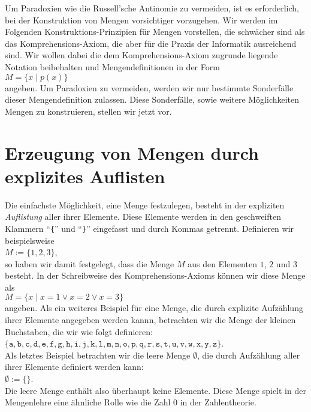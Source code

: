 Um  Paradoxien wie die Russell'sche Antinomie  zu vermeiden, ist es erforderlich, bei der
Konstruktion von Mengen vorsichtiger vorzugehen.
Wir werden im Folgenden Konstruktions-Prinzipien f\"{u}r Mengen vorstellen,
die schw\"{a}cher sind als das Komprehensions-Axiom, die aber f\"{u}r die Praxis der Informatik
ausreichend sind.  Wir wollen dabei die dem Komprehensions-Axiom zugrunde liegende Notation 
beibehalten und Mengendefinitionen in der Form \\[0.2cm]
\hspace*{1.3cm} $M = \{ x \mid p(x) \}$  \\[0.2cm]
angeben.  Um Paradoxien zu vermeiden, werden wir nur bestimmte
Sonderf\"{a}lle dieser Mengendefinition zulassen.  Diese Sonderf\"{a}lle, sowie weitere M\"{o}glichkeiten
Mengen zu konstruieren, stellen wir jetzt vor.

\section{Erzeugung von Mengen durch explizites Auflisten}
Die einfachste M\"{o}glichkeit, eine Menge festzulegen, besteht in der expliziten
\emph{Auflistung} aller ihrer Elemente. Diese Elemente werden in den geschweiften
Klammern ``\texttt{\{}'' und ``\texttt{\}}'' eingefasst und durch Kommas getrennt.
Definieren wir beispielsweise \\[0.2cm]
\hspace*{1.3cm} $M := \{ 1, 2, 3 \}$, \\[0.2cm]
so haben wir damit festgelegt, dass die Menge $M$ aus den Elementen $1$, $2$ und $3$
besteht. In der Schreibweise des Komprehensions-Axioms k\"{o}nnen wir diese Menge als \\[0.2cm]
\hspace*{1.3cm} $M = \{ x \mid x = 1 \vee x = 2 \vee x = 3 \}$ \\[0.2cm]
angeben.
Als ein weiteres Beispiel f\"{u}r eine Menge, die durch explizite Aufz\"{a}hlung ihrer Elemente
angegeben werden kannn, betrachten wir die Menge der kleinen Buchstaben, die wir wie folgt
definieren: \\[0.2cm]
\hspace*{1.3cm} 
$\{\mathtt{a}, \mathtt{b}, \mathtt{c}, \mathtt{d}, \mathtt{e},
 \mathtt{f}, \mathtt{g}, \mathtt{h}, \mathtt{i}, \mathtt{j}, \mathtt{k}, \mathtt{l},
 \mathtt{m}, \mathtt{n}, \mathtt{o}, \mathtt{p}, \mathtt{q}, \mathtt{r}, \mathtt{s},
 \mathtt{t}, \mathtt{u}, \mathtt{v}, \mathtt{w}, \mathtt{x}, \mathtt{y}, \mathtt{z\}}$.
 \\[0.2cm]
Als letztes Beispiel betrachten wir die leere Menge $\emptyset$, die durch
Aufz\"{a}hlung aller ihrer Elemente definiert werden kann:
\\[0.2cm]
\hspace*{1.3cm}
$\emptyset := \{\}$.
\\[0.2cm]
Die leere Menge enth\"{a}lt also \"{u}berhaupt keine Elemente.  Diese Menge spielt in der Mengenlehre eine
\"{a}hnliche Rolle wie die Zahl $0$ in der Zahlentheorie.


